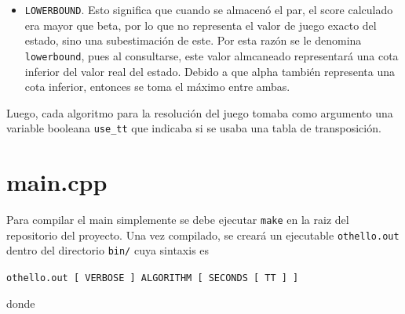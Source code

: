 \documentclass[a4paper,10pt]{article}
\begin{document}
\begin{itemize}
\begin{itemize}
      \item \verb|LOWERBOUND|. Esto significa que cuando se almacen\'o el par, el score  
      calculado era mayor que beta, por lo que no representa el valor de juego exacto 
      del estado, sino una subestimaci\'on de este. Por esta raz\'on se le denomina 
      \verb|lowerbound|, pues al consultarse, este valor almcaneado representar\'a una 
      cota inferior del valor real del estado. Debido a que alpha tambi\'en representa 
      una cota inferior, entonces se toma el m\'aximo entre ambas.
    \end{itemize}
  \end{itemize}

  Luego, cada algoritmo para la resoluci\'on del juego tomaba como argumento una variable 
  booleana \verb|use_tt| que indicaba si se usaba una tabla de transposici\'on.

\section*{main.cpp}
  Para compilar el main simplemente se debe ejecutar \verb|make| en la raiz del repositorio
  del proyecto. Una vez compilado, se crear\'a un ejecutable \verb|othello.out| dentro del 
  directorio \verb|bin/| cuya sintaxis es 

  \begin{center}
    \verb|othello.out [ VERBOSE ] ALGORITHM [ SECONDS [ TT ] ]|
  \end{center}

  \noindent
  donde 
\end{document}
